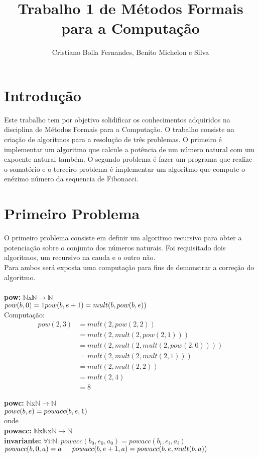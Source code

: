 \documentclass{article}
\title{Trabalho 1 de Métodos Formais para a Computação}
\author{Cristiano Bolla Fernandes, Benito Michelon e Silva}
\begin{document}
\maketitle

\section{Introdução}
Este trabalho tem por objetivo solidificar os conhecimentos adquiridos na disciplina de Métodos Formais para a Computação.
O trabalho consiste na criação de algoritmos para a resolução de três problemas. O primeiro é implementar um algoritmo que calcule a
potência de um número natural com um expoente natural também. O segundo problema é fazer um programa que realize o somatório e o
terceiro problema é implementar um algoritmo que compute o enézimo número da sequencia de Fibonacci.

\section{Primeiro Problema}
O primeiro problema consiste em definir um algoritmo recursivo para obter a potenciação sobre o conjunto dos números naturais.
Foi requisitado dois algoritmos, um recursivo na cauda e o outro não.\\
Para ambos será exposta uma computação para fins de demonstrar a correção do algoritmo.\\
\\
\textbf{pow:} $\mathbb{N}$x$\mathbb{N}$$ \rightarrow \mathbb{N}$\\
$pow(b, 0) = 1\\
pow(b, e+1) = mult(b, pow(b, e))\\$
\\

Computação:\\
\begin{align*}
pow(2,3) &= mult(2, pow(2, 2))\\
&= mult(2, mult(2, pow(2, 1)))\\
&= mult(2, mult(2, mult(2, pow(2, 0))))\\
&= mult(2, mult(2, mult(2, 1)))\\
&= mult(2, mult(2, 2))\\
&= mult(2, 4)\\
&= 8
\end{align*}

\noindent \textbf{powc:} $\mathbb{N}$x$\mathbb{N}$$ \rightarrow \mathbb{N}$\\
$powc(b, e) = powacc(b, e, 1)\\$
\\
onde\\
\indent \textbf{powacc:} $\mathbb{N}$x$\mathbb{N}$x$\mathbb{N}$$ \rightarrow \mathbb{N}$\\
\indent \textbf{invariante:} $\forall$i:$\mathbb{N}.\: powacc(b_0,e_0, a_0) = powacc(b_i, e_i, a_i)$\\
\indent $powacc(b, 0, a) = a\\
\indent powacc(b, e+1, a) = powacc(b, e, mult(b, a))\\$
\end{document}
